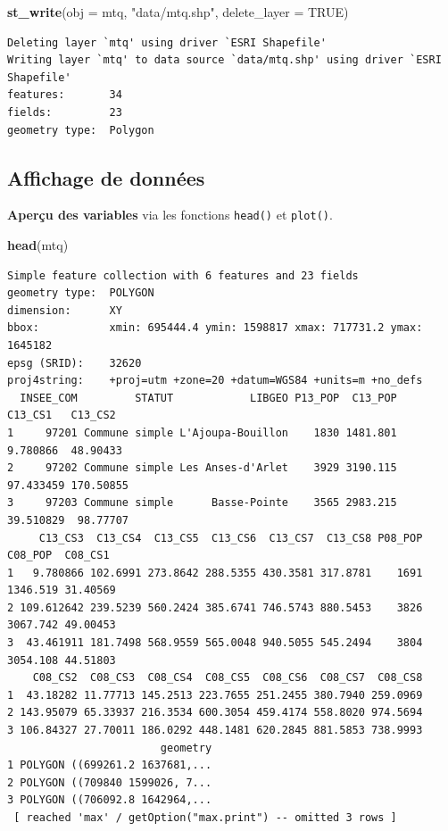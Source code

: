 \documentclass[]{book}
\newenvironment{Shaded}{\begin{snugshade}}{\end{snugshade}}
\newcommand{\KeywordTok}[1]{\textcolor[rgb]{0.13,0.29,0.53}{\textbf{#1}}}
\newcommand{\DataTypeTok}[1]{\textcolor[rgb]{0.13,0.29,0.53}{#1}}
\newcommand{\StringTok}[1]{\textcolor[rgb]{0.31,0.60,0.02}{#1}}
\newcommand{\OtherTok}[1]{\textcolor[rgb]{0.56,0.35,0.01}{#1}}
\newcommand{\NormalTok}[1]{#1}
\begin{document}
\begin{Shaded}
\begin{Highlighting}[]
\KeywordTok{st_write}\NormalTok{(}\DataTypeTok{obj =}\NormalTok{ mtq, }\StringTok{"data/mtq.shp"}\NormalTok{, }\DataTypeTok{delete_layer =} \OtherTok{TRUE}\NormalTok{)}
\end{Highlighting}
\end{Shaded}

\begin{verbatim}
Deleting layer `mtq' using driver `ESRI Shapefile'
Writing layer `mtq' to data source `data/mtq.shp' using driver `ESRI Shapefile'
features:       34
fields:         23
geometry type:  Polygon
\end{verbatim}

\subsection{Affichage de données}\label{affichage-de-donnees}

\textbf{Aperçu des variables} via les fonctions \texttt{head()} et
\texttt{plot()}.

\begin{Shaded}
\begin{Highlighting}[]
\KeywordTok{head}\NormalTok{(mtq)}
\end{Highlighting}
\end{Shaded}

\begin{verbatim}
Simple feature collection with 6 features and 23 fields
geometry type:  POLYGON
dimension:      XY
bbox:           xmin: 695444.4 ymin: 1598817 xmax: 717731.2 ymax: 1645182
epsg (SRID):    32620
proj4string:    +proj=utm +zone=20 +datum=WGS84 +units=m +no_defs
  INSEE_COM         STATUT            LIBGEO P13_POP  C13_POP   C13_CS1   C13_CS2
1     97201 Commune simple L'Ajoupa-Bouillon    1830 1481.801  9.780866  48.90433
2     97202 Commune simple Les Anses-d'Arlet    3929 3190.115 97.433459 170.50855
3     97203 Commune simple      Basse-Pointe    3565 2983.215 39.510829  98.77707
     C13_CS3  C13_CS4  C13_CS5  C13_CS6  C13_CS7  C13_CS8 P08_POP  C08_POP  C08_CS1
1   9.780866 102.6991 273.8642 288.5355 430.3581 317.8781    1691 1346.519 31.40569
2 109.612642 239.5239 560.2424 385.6741 746.5743 880.5453    3826 3067.742 49.00453
3  43.461911 181.7498 568.9559 565.0048 940.5055 545.2494    3804 3054.108 44.51803
    C08_CS2  C08_CS3  C08_CS4  C08_CS5  C08_CS6  C08_CS7  C08_CS8
1  43.18282 11.77713 145.2513 223.7655 251.2455 380.7940 259.0969
2 143.95079 65.33937 216.3534 600.3054 459.4174 558.8020 974.5694
3 106.84327 27.70011 186.0292 448.1481 620.2845 881.5853 738.9993
                        geometry
1 POLYGON ((699261.2 1637681,...
2 POLYGON ((709840 1599026, 7...
3 POLYGON ((706092.8 1642964,...
 [ reached 'max' / getOption("max.print") -- omitted 3 rows ]
\end{verbatim}
\end{document}
